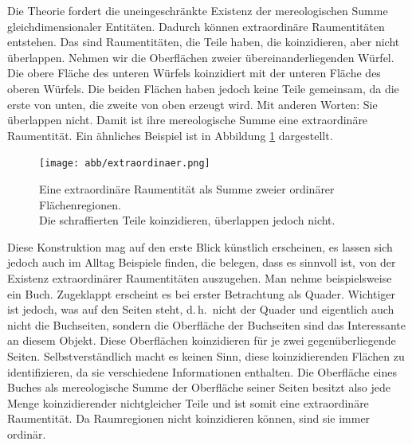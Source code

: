 		Die Theorie fordert die uneingeschränkte Existenz der mereologischen Summe gleichdimensionaler Entitäten. Dadurch können extraordinäre Raumentitäten entstehen. Das sind Raumentitäten, die Teile haben, die koinzidieren, aber nicht überlappen.
		Nehmen wir die Oberflächen zweier übereinanderliegenden Würfel. 
		Die obere Fläche des unteren Würfels koinzidiert mit der unteren Fläche des oberen Würfels. Die beiden Flächen haben jedoch keine Teile gemeinsam, da die erste von unten, die zweite von oben erzeugt wird. 
		Mit anderen Worten: Sie überlappen nicht. Damit ist ihre mereologische Summe eine extraordinäre Raumentität.
		Ein ähnliches Beispiel ist in Abbildung \ref{fig:extraordinaer} dargestellt.
        \begin{figure}[ht]
            \centering
            \texttt{[image: abb/extraordinaer.png]}
            \caption[Eine extraordinäre Raumentität als Summe zweier ordinärer Flächenregionen]{Eine extraordinäre Raumentität als Summe zweier ordinärer Flächenregionen.\\
            Die schraffierten Teile koinzidieren, überlappen jedoch nicht.}
            \label{fig:extraordinaer}
        \end{figure}
		Diese Konstruktion mag auf den erste Blick künstlich erscheinen, es lassen sich jedoch auch im Alltag Beispiele finden, die belegen, dass es sinnvoll ist, von der Existenz extraordinärer Raumentitäten auszugehen. 
		Man nehme beispielsweise ein Buch. 
		Zugeklappt erscheint es bei erster Betrachtung als Quader. 
		Wichtiger ist jedoch, was auf den Seiten steht, d.\,h.\ nicht der Quader und eigentlich auch nicht die Buchseiten, sondern die Oberfläche der Buchseiten sind das Interessante an diesem Objekt. 
		Diese Oberflächen koinzidieren für je zwei gegenüberliegende Seiten.
		Selbstverständlich macht es keinen Sinn, diese koinzidierenden Flächen zu identifizieren, da sie verschiedene Informationen enthalten. 
		Die Oberfläche eines Buches als mereologische Summe der Oberfläche seiner Seiten besitzt also jede Menge koinzidierender nichtgleicher Teile und ist somit eine extraordinäre Raumentität.
		Da Raumregionen nicht koinzidieren können, sind sie immer ordinär.
		
		
		
